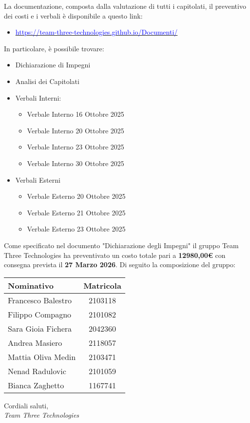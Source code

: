 \documentclass[a4paper,12pt]{article}
\begin{document}
La documentazione, composta dalla valutazione di tutti i capitolati, il preventivo dei costi e i verbali è disponibile a questo link: 

\begin{itemize}
    \item \href{https://team-three-technologies.github.io/Documenti/}{\textcolor{blue} {https://team-three-technologies.github.io/Documenti/}}
\end{itemize}

In particolare, è possibile trovare: 
\begin{itemize}
    \item Dichiarazione di Impegni
    \item Analisi dei Capitolati
    \item Verbali Interni: 
    \begin{itemize}
        \item Verbale Interno 16 Ottobre 2025
        \item Verbale Interno 20 Ottobre 2025
        \item Verbale Interno 23 Ottobre 2025
        \item Verbale Interno 30 Ottobre 2025
    \end{itemize}
    \item Verbali Esterni
    \begin{itemize}
        \item Verbale Esterno 20 Ottobre 2025
        \item Verbale Esterno 21 Ottobre 2025
        \item Verbale Esterno 23 Ottobre 2025
    \end{itemize}
\end{itemize}

Come specificato nel documento "Dichiarazione degli Impegni" il gruppo Team Three \mbox{Technologies} ha preventivato un costo totale pari a \textbf{12980,00\euro} con consegna prevista il \textbf{27 Marzo 2026}. \newpage
Di seguito la composizione del gruppo: 
\begin{center}
\begin{tabular}{|l|c|}
\hline
\rowcolor{lightgray}
\textbf{Nominativo} & \textbf{Matricola} \\ 
\hline
Francesco Balestro & 2103118 \\ 
Filippo Compagno & 2101082 \\ 
Sara Gioia Fichera & 2042360 \\ 
Andrea Masiero & 2118057\\
Mattia Oliva Medin & 2103471\\
Nenad Radulovic & 2101059\\
Bianca Zaghetto & 1167741\\
\hline

\end{tabular}
\end{center}

\vspace{1cm}
Cordiali saluti,\\[0.3cm]
\textit{Team Three Technologies}
\end{document}

